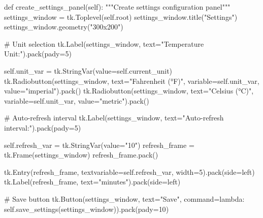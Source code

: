 \documentclass[
  letterpaper,
  DIV=11,
  numbers=noendperiod,
  oneside]{scrreprt}
\newenvironment{Shaded}{}{}
\newcommand{\CommentTok}[1]{\textcolor[rgb]{0.42,0.45,0.49}{#1}}
\newcommand{\DecValTok}[1]{\textcolor[rgb]{0.00,0.36,0.77}{#1}}
\newcommand{\KeywordTok}[1]{\textcolor[rgb]{0.84,0.23,0.29}{#1}}
\newcommand{\NormalTok}[1]{\textcolor[rgb]{0.14,0.16,0.18}{#1}}
\newcommand{\OperatorTok}[1]{\textcolor[rgb]{0.14,0.16,0.18}{#1}}
\newcommand{\StringTok}[1]{\textcolor[rgb]{0.01,0.18,0.38}{#1}}
\newcommand{\VariableTok}[1]{\textcolor[rgb]{0.89,0.38,0.04}{#1}}
\begin{document}
\begin{Shaded}
\begin{Highlighting}[]
\KeywordTok{def}\NormalTok{ create\_settings\_panel(}\VariableTok{self}\NormalTok{):}
    \CommentTok{"""Create settings configuration panel"""}
\NormalTok{    settings\_window }\OperatorTok{=}\NormalTok{ tk.Toplevel(}\VariableTok{self}\NormalTok{.root)}
\NormalTok{    settings\_window.title(}\StringTok{"Settings"}\NormalTok{)}
\NormalTok{    settings\_window.geometry(}\StringTok{"300x200"}\NormalTok{)}
    
    \CommentTok{\# Unit selection}
\NormalTok{    tk.Label(settings\_window, text}\OperatorTok{=}\StringTok{"Temperature Unit:"}\NormalTok{).pack(pady}\OperatorTok{=}\DecValTok{5}\NormalTok{)}
    
    \VariableTok{self}\NormalTok{.unit\_var }\OperatorTok{=}\NormalTok{ tk.StringVar(value}\OperatorTok{=}\VariableTok{self}\NormalTok{.current\_unit)}
\NormalTok{    tk.Radiobutton(settings\_window, text}\OperatorTok{=}\StringTok{"Fahrenheit (°F)"}\NormalTok{, }
\NormalTok{                  variable}\OperatorTok{=}\VariableTok{self}\NormalTok{.unit\_var, value}\OperatorTok{=}\StringTok{"imperial"}\NormalTok{).pack()}
\NormalTok{    tk.Radiobutton(settings\_window, text}\OperatorTok{=}\StringTok{"Celsius (°C)"}\NormalTok{, }
\NormalTok{                  variable}\OperatorTok{=}\VariableTok{self}\NormalTok{.unit\_var, value}\OperatorTok{=}\StringTok{"metric"}\NormalTok{).pack()}
    
    \CommentTok{\# Auto{-}refresh interval}
\NormalTok{    tk.Label(settings\_window, text}\OperatorTok{=}\StringTok{"Auto{-}refresh interval:"}\NormalTok{).pack(pady}\OperatorTok{=}\DecValTok{5}\NormalTok{)}
    
    \VariableTok{self}\NormalTok{.refresh\_var }\OperatorTok{=}\NormalTok{ tk.StringVar(value}\OperatorTok{=}\StringTok{"10"}\NormalTok{)}
\NormalTok{    refresh\_frame }\OperatorTok{=}\NormalTok{ tk.Frame(settings\_window)}
\NormalTok{    refresh\_frame.pack()}
    
\NormalTok{    tk.Entry(refresh\_frame, textvariable}\OperatorTok{=}\VariableTok{self}\NormalTok{.refresh\_var, width}\OperatorTok{=}\DecValTok{5}\NormalTok{).pack(side}\OperatorTok{=}\StringTok{\textquotesingle{}left\textquotesingle{}}\NormalTok{)}
\NormalTok{    tk.Label(refresh\_frame, text}\OperatorTok{=}\StringTok{"minutes"}\NormalTok{).pack(side}\OperatorTok{=}\StringTok{\textquotesingle{}left\textquotesingle{}}\NormalTok{)}
    
    \CommentTok{\# Save button}
\NormalTok{    tk.Button(settings\_window, text}\OperatorTok{=}\StringTok{"Save"}\NormalTok{, }
\NormalTok{             command}\OperatorTok{=}\KeywordTok{lambda}\NormalTok{: }\VariableTok{self}\NormalTok{.save\_settings(settings\_window)).pack(pady}\OperatorTok{=}\DecValTok{10}\NormalTok{)}
\end{Highlighting}
\end{Shaded}
\end{document}
